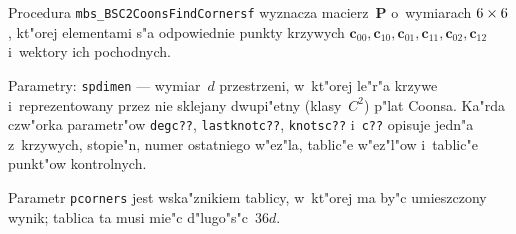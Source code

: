 \vspace{\bigskipamount}
\begin{sloppypar}
Procedura \texttt{mbs\_BSC2CoonsFindCornersf} wyznacza macierz~$\bm{P}$
o~wymiarach $6\times\nobreak 6$, kt"orej elementami s"a odpowiednie punkty
krzywych
$\bm{c}_{00},\bm{c}_{10},\bm{c}_{01},\bm{c}_{11},\bm{c}_{02},\bm{c}_{12}$
i~wektory ich pochodnych.%
\end{sloppypar}

Parametry: \texttt{spdimen} --- wymiar~$d$ przestrzeni, w~kt"orej le"r"a
krzywe i~reprezentowany przez nie sklejany dwupi"etny (klasy~$C^2$) 
p"lat Coonsa. Ka"rda czw"orka parametr"ow \texttt{degc??},
\texttt{lastknotc??}, \texttt{knotsc??} i~\texttt{c??}    
opisuje jedn"a z~krzywych, stopie"n, numer ostatniego w"ez"la, tablic"e
w"ez"l"ow i~tablic"e punkt"ow kontrolnych.    

Parametr \texttt{pcorners} jest wska"znikiem tablicy, w~kt"orej ma by"c
umieszczony wynik; tablica ta musi mie"c d"lugo"s"c~$36d$.


